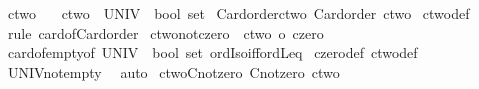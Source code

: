 \begin{isabellebody}
\endisatagproof
{\isafoldproof}%
%
\isadelimproof
%
\endisadelimproof
%
\isadelimdocument
%
\endisadelimdocument
%
\isatagdocument
%
\isamarkuptrue%
%
\endisatagdocument
{\isafolddocument}%
%
\isadelimdocument
%
\endisadelimdocument
{}\isamarkupfalse%
\ ctwo\ \isanewline
\ \ {\isachardoublequoteopen}ctwo\ {\isacharequal}{\kern0pt}\ {\isacharbar}{\kern0pt}UNIV\ {\isacharcolon}{\kern0pt}{\isacharcolon}{\kern0pt}\ bool\ set{\isacharbar}{\kern0pt}{\isachardoublequoteclose}\isanewline
\isanewline
{}\isamarkupfalse%
\ Card{\isacharunderscore}{\kern0pt}order{\isacharunderscore}{\kern0pt}ctwo{\isacharcolon}{\kern0pt}\ {\isachardoublequoteopen}Card{\isacharunderscore}{\kern0pt}order\ ctwo{\isachardoublequoteclose}\isanewline
%
\isadelimproof
%
\endisadelimproof
%
\isatagproof
{}\isamarkupfalse%
\ ctwo{\isacharunderscore}{\kern0pt}def\ \isamarkupfalse%
\ {\isacharparenleft}{\kern0pt}rule\ card{\isacharunderscore}{\kern0pt}of{\isacharunderscore}{\kern0pt}Card{\isacharunderscore}{\kern0pt}order{\isacharparenright}{\kern0pt}%
\endisatagproof
{\isafoldproof}%
%
\isadelimproof
\isanewline
%
\endisadelimproof
\isanewline
{}\isamarkupfalse%
\ ctwo{\isacharunderscore}{\kern0pt}not{\isacharunderscore}{\kern0pt}czero{\isacharcolon}{\kern0pt}\ {\isachardoublequoteopen}{\isasymnot}\ {\isacharparenleft}{\kern0pt}ctwo\ {\isacharequal}{\kern0pt}o\ czero{\isacharparenright}{\kern0pt}{\isachardoublequoteclose}\isanewline
%
\isadelimproof
%
\endisadelimproof
%
\isatagproof
{}\isamarkupfalse%
\ card{\isacharunderscore}{\kern0pt}of{\isacharunderscore}{\kern0pt}empty{}{\isacharbrackleft}{\kern0pt}of\ {\isachardoublequoteopen}UNIV\ {\isacharcolon}{\kern0pt}{\isacharcolon}{\kern0pt}\ bool\ set{\isachardoublequoteclose}{\isacharbrackright}{\kern0pt}\ ordIso{\isacharunderscore}{\kern0pt}iff{\isacharunderscore}{\kern0pt}ordLeq\isanewline
{}\isamarkupfalse%
\ czero{\isacharunderscore}{\kern0pt}def\ ctwo{\isacharunderscore}{\kern0pt}def\ \isamarkupfalse%
\ UNIV{\isacharunderscore}{\kern0pt}not{\isacharunderscore}{\kern0pt}empty\ \isamarkupfalse%
\ auto%
\endisatagproof
{\isafoldproof}%
%
\isadelimproof
\isanewline
%
\endisadelimproof
\isanewline
{}\isamarkupfalse%
\ ctwo{\isacharunderscore}{\kern0pt}Cnotzero{\isacharcolon}{\kern0pt}\ {\isachardoublequoteopen}Cnotzero\ ctwo{\isachardoublequoteclose}\isanewline
%
\isadelimproof
%
\endisadelimproof
%
\isatagproof
{}\isamarkupfalse%

\end{isabellebody}
